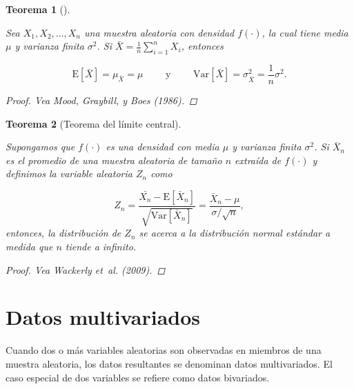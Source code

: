 \documentclass[
  us-letterpaper,
]{scrreprt}
\theoremstyle{plain}
\newtheorem{theorem}{Teorema}[chapter]
\theoremstyle{definition}
\theoremstyle{definition}
\theoremstyle{plain}
\theoremstyle{remark}
\begin{document}
\begin{theorem}[]\protect\hypertarget{thm-meanvar}{}\label{thm-meanvar}

Sea \(X_1, X_2, \ldots, X_n\) una muestra aleatoria con densidad
\(f(\cdot)\), la cual tiene media \(\mu\) y varianza finita
\(\sigma^2\). Si \(\bar{X} = \frac{1}{n}\sum\limits_{i=1}^n X_i\),
entonces

\[ \mathrm{E}[\bar X]=\mu_{\bar X}=\mu\qquad \text{ y }\qquad \mathrm{Var}[\bar X]=\sigma_{\bar X}^2 =\frac{1}{n}\sigma^2.\]

\begin{proof}
Vea Mood, Graybill, y Boes (1986).
\end{proof}

\end{theorem}

\begin{theorem}[Teorema del límite
central]\protect\hypertarget{thm-TCL}{}\label{thm-TCL}

Supongamos que \(f(\cdot)\) es una densidad con media \(\mu\) y varianza
finita \(\sigma^2\). Si \(\bar{X}_n\) es el promedio de una muestra
aleatoria de tamaño \(n\) extraída de \(f(\cdot)\) y definimos la
variable aleatoria \(Z_n\) como

\[ Z_n = \frac{\bar{X_n}-\mathrm E[\bar X_n]}{\sqrt{\mathrm{Var}[\bar X_n]}}=\frac{\bar X_n-\mu}{\sigma/\sqrt n},\]
entonces, la distribución de \(Z_n\) se acerca a la distribución normal
estándar a medida que \(n\) tiende a infinito.

\begin{proof}
Vea Wackerly et~al. (2009).
\end{proof}

\end{theorem}

\section{Datos multivariados}\label{datos-multivariados}

Cuando dos o más variables aleatorias son observadas en miembros de una
muestra aleatoria, los datos resultantes se denominan datos
multivariados. El caso especial de dos variables se refiere como datos
bivariados.
\end{document}
